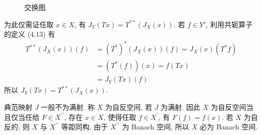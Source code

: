 \documentclass[openany]{ctexbook}
\theoremstyle{kaiti}
\theoremstyle{normal}
\begin{document}
\begin{figure}[h]
  \centering
  \caption{交换图.}
  \label{fig:4_2}
\end{figure}

为此仅需证任取 $x \in X$, 有 $J_{Y}(T x)=T^{**}\left(J_{X}(x)\right)$. 若 $f \in Y'$, 利用共轭算子的定义 (4.13) 有
$$
  \begin{aligned}
    T^{* *}\left(J_{X}(x)\right)(f)
    &=\left(T^{*}\right)^{*}\left(J_{X}(x)\right)(f)=J_{X}(x)\left(T^{*} f\right) \\
    &=\left(T^{*}(f)\right)(x)=f(T x) \\
    &=J_{Y}(T x)(f)
  \end{aligned}
$$
所以 $J_{Y}(T x)=T^{* *}\left(J_{X}(x)\right)$.

典范映射 $J$ 一般不为满射. 称 $X$ 为自反空间, 若 $J$ 为满射. 因此 $X$ 为自反空间当且仅当任给 $F \in X^{\prime \prime}$, 存在 $x \in X$, 使得任取 $f \in X^{\prime}$, 有 $F(f)=f(x)$. 若 $X$ 为自反的, 则 $X$ 与 $X^{\prime \prime}$ 等距同构, 由于 $X^{\prime \prime}$ 为 Banach 空间, 所以 $X$ 必为 Banach 空间.
\end{document}
